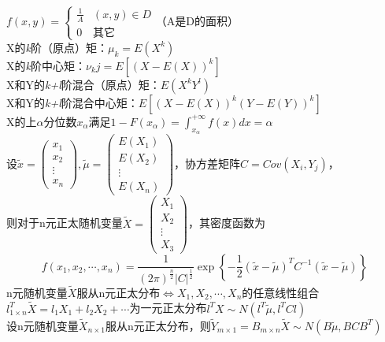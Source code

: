 \documentclass{report}
\newcommand{\xkuo}[1]{\left(#1\right)}
\newcommand{\dkuo}[1]{\left\lbrace#1\right\rbrace}
\newcommand{\akuo}[1]{\left[#1\right]}
\newcommand{\abs}[1]{\left|#1\right|}
\newcommand{\huawenxingkai}{\CJKfamily{hwxk}}
\begin{document}
	\huawenxingkai
	$ f\xkuo{x,y}=\begin{cases}
	\frac{1}{A}&\xkuo{x,y}\in D\\
	0&\text{其它}
	\end{cases} $（A是D的面积）\\
	X的\textit{k}阶（原点）矩：\(\mu_k=E\xkuo{X^k}\)\\
	X的\textit{k}阶中心矩：\(\nu_kj=E\akuo{\xkuo{X-E\xkuo{X}}^k}\)\\
	X和Y的\textit{k+l}阶混合（原点）矩：\(E\xkuo{X^kY^l}\)\\
	X和Y的\textit{k+l}阶混合中心矩：\(E\akuo{\xkuo{X-E\xkuo{X}}^k\xkuo{Y-E\xkuo{Y}}^k}\)\\
	X的上$\alpha$分位数$ x_\alpha $满足\(1-F\xkuo{x_\alpha}=\int_{x_\alpha}^{+\infty}f\xkuo{x}dx=\alpha\)\\
	设\(\tilde{x}=\begin{pmatrix}
	x_1\\x_2\\\vdots\\x_n
	\end{pmatrix}, \tilde{\mu}=\begin{pmatrix}
	E\xkuo{X_1}\\E\xkuo{X_2}\\\vdots\\E\xkuo{X_n}
	\end{pmatrix}\)，协方差矩阵\(C=Cov\xkuo{X_i,Y_j}\)，\\
	则对于n元正太随机变量\(\tilde{X}=\begin{pmatrix}
	X_1\\X_2\\\vdots\\X_3
	\end{pmatrix}\)，其密度函数为\[f\xkuo{x_1,x_2,\cdots,x_n}=\frac{1}{\xkuo{2\pi}^{\frac{n}{2}}\abs{C}^{\frac12}}\exp\dkuo{-\frac12\xkuo{\tilde{x}-\tilde{\mu}}^TC^{-1}\xkuo{\tilde{x}-\tilde{\mu}}}\]
	n元随机变量\(\tilde{X}\)服从n元正太分布\(\Leftrightarrow X_1,X_2,\cdots ,X_n\)的任意线性组合\(l^T_{1\times n}\tilde{X}=l_1X_1+l_2X_2+\cdots\)为一元正太分布\(l^TX\sim N\xkuo{l^T\tilde{\mu},l^TCl}\)\\
	设n元随机变量\(\tilde{X}_{n\times 1}\)服从n元正太分布，则\(\tilde{Y}_{m\times 1}=B_{m\times n}\tilde{X}\sim N\xkuo{B\tilde{\mu},BCB^T}\)
\end{document}
